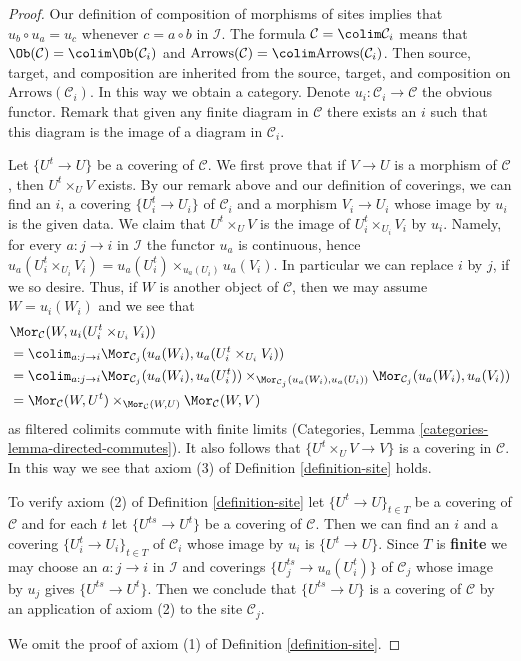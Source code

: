 \begin{proof}
Our definition of composition of morphisms of sites implies that
$u_b \circ u_a = u_c$ whenever $c = a \circ b$ in $\mathcal{I}$.
The formula $\mathcal{C} = \colim \mathcal{C}_i$ means that
$\Ob(\mathcal{C}) = \colim \Ob(\mathcal{C}_i)$ and
$\text{Arrows}(\mathcal{C}) = \colim \text{Arrows}(\mathcal{C}_i)$.
Then source, target, and composition are inherited from the
source, target, and composition on $\text{Arrows}(\mathcal{C}_i)$.
In this way we obtain a category. 
Denote $u_i : \mathcal{C}_i \to \mathcal{C}$ the obvious functor.
Remark that given any finite diagram in $\mathcal{C}$
there exists an $i$ such that this diagram is
the image of a diagram in $\mathcal{C}_i$.

\medskip\noindent
Let $\{U^t \to U\}$ be a covering of $\mathcal{C}$. We first prove that if
$V \to U$ is a morphism of $\mathcal{C}$, then $U^t \times_U V$ exists.
By our remark above and our definition of coverings, we can find an
$i$, a covering $\{U_i^t \to U_i\}$ of $\mathcal{C}_i$ and a morphism
$V_i \to U_i$ whose image by $u_i$ is the given data. We claim that
$U^t \times_U V$ is the image of $U^t_i \times_{U_i} V_i$ by $u_i$.
Namely, for every $a : j \to i$ in $\mathcal{I}$ the functor $u_a$
is continuous, hence
$u_a(U^t_i \times_{U_i} V_i) = u_a(U^t_i) \times_{u_a(U_i)} u_a(V_i)$.
In particular we can replace $i$ by $j$, if we so desire.
Thus, if $W$ is another object of $\mathcal{C}$, then we may
assume $W = u_i(W_i)$ and we see that
\begin{align*}
& \Mor_\mathcal{C}(W, u_i(U^t_i \times_{U_i} V_i)) \\
& =
\colim_{a : j \to i}
\Mor_{\mathcal{C}_j}(u_a(W_i), u_a(U^t_i \times_{U_i} V_i)) \\
& =
\colim_{a : j \to i}
\Mor_{\mathcal{C}_j}(u_a(W_i), u_a(U^t_i))
\times_{\Mor_{\mathcal{C}_j}(u_a(W_i), u_a(U_i))}
\Mor_{\mathcal{C}_j}(u_a(W_i), u_a(V_i)) \\
& =
\Mor_\mathcal{C}(W, U^t)
\times_{\Mor_\mathcal{C}(W, U)}
\Mor_\mathcal{C}(W, V)
\end{align*}
as filtered colimits commute with finite limits
(Categories, Lemma \ref{categories-lemma-directed-commutes}).
It also follows that
$\{U^t \times_U V \to V\}$ is a covering in $\mathcal{C}$.
In this way we see that axiom (3) of Definition \ref{definition-site} holds.

\medskip\noindent
To verify axiom (2) of Definition \ref{definition-site}
let $\{U^t \to U\}_{t \in T}$ be a covering of $\mathcal{C}$
and for each $t$ let $\{U^{ts} \to U^t\}$ be a covering of
$\mathcal{C}$. Then we can find an $i$ and a covering
$\{U^t_i \to U_i\}_{t \in T}$ of $\mathcal{C}_i$ whose image by $u_i$ is
$\{U^t \to U\}$. Since $T$ is {\bf finite} we may choose an $a : j \to i$
in $\mathcal{I}$ and coverings $\{U^{ts}_j \to u_a(U^t_i)\}$ of
$\mathcal{C}_j$ whose image by $u_j$ gives $\{U^{ts} \to U^t\}$.
Then we conclude that $\{U^{ts} \to U\}$ is a covering of $\mathcal{C}$
by an application of axiom (2) to the site $\mathcal{C}_j$.

\medskip\noindent
We omit the proof of axiom (1) of Definition \ref{definition-site}.
\end{proof}

